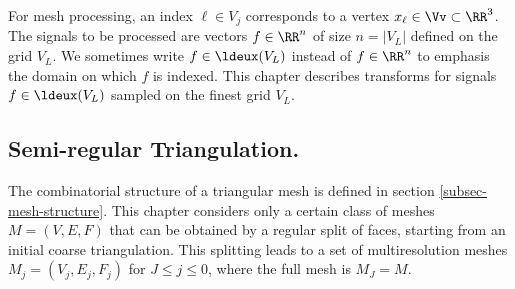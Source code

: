 For mesh processing, an index $\ell \in V_j$ corresponds to a vertex $x_\ell \in \Vv \subset \RR^3$. The signals to be processed are vectors $f \in \RR^n$ of size $n=|V_L|$ defined on the grid $V_L$. We sometimes write $f \in \ldeux(V_L)$ instead of $f \in \RR^n$ to emphasis the domain on which $f$ is indexed.  This chapter describes transforms for signals $f \in \ldeux(V_L)$ sampled on the finest grid $V_L$. 


\subsection{Semi-regular Triangulation.}

The combinatorial structure of a triangular mesh is defined in section \ref{subsec-mesh-structure}. This chapter considers only a certain class of meshes $M = (V,E,F)$ that can be obtained by a regular split of faces, starting from an initial coarse triangulation. This splitting leads to a set of multiresolution meshes $M_j = (V_j,E_j,F_j)$ for $J \leq j \leq 0$, where the full mesh is $M_{J} = M$. 


